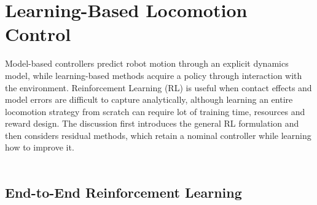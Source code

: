 \section{Learning-Based Locomotion Control}

Model-based controllers predict robot motion through an explicit dynamics
model, while learning-based methods acquire a policy through interaction with
the environment. Reinforcement Learning (RL) is useful when contact effects
and model errors are difficult to capture analytically, although learning an
entire locomotion strategy from scratch can require lot of training time, 
resources and reward design. The discussion first
introduces the general RL formulation and then considers residual
methods, which retain a nominal controller while learning how to improve it.\\
\
\subsection{End-to-End Reinforcement Learning}

